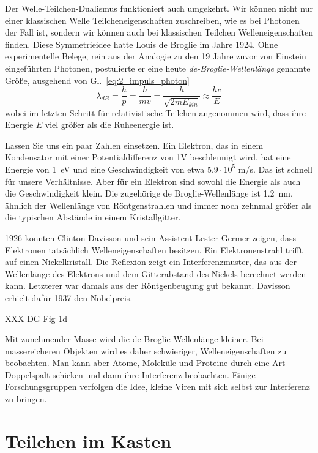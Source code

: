  Der Welle-Teilchen-Dualismus funktioniert auch umgekehrt. Wir können nicht nur einer klassischen Welle Teilcheneigenschaften zuschreiben, wie es bei Photonen der Fall ist, sondern wir können auch bei klassischen Teilchen Welleneigenschaften finden. Diese Symmetrieidee hatte Louis de Broglie im Jahre 1924. Ohne experimentelle Belege, rein aus der Analogie zu den 19 Jahre zuvor von Einstein eingeführten Photonen, postulierte er eine heute \emph{de-Broglie-Wellenlänge} genannte Größe, ausgehend von Gl.~\ref{eq:2_impuls_photon}
 \begin{equation}
     \lambda_{dB} = \frac{h}{p} = \frac{h}{m v} = \frac{h}{\sqrt{2 m E_{kin}}} \approx \frac{h c}{E}
 \end{equation}
 wobei im letzten Schritt für relativistische Teilchen angenommen wird, dass ihre Energie $E$ viel größer als die Ruheenergie ist.
 
 
 Lassen Sie uns ein paar Zahlen einsetzen. Ein Elektron, das in einem Kondensator mit einer Potentialdifferenz von \si{1}{V} beschleunigt wird, hat eine Energie von 1~eV und eine Geschwindigkeit von etwa $5.9 \cdot 10^5$ m/s. Das ist schnell für unsere Verhältnisse. Aber für ein Elektron sind sowohl die Energie als auch die Geschwindigkeit klein. Die zugehörige de Broglie-Wellenlänge ist 1.2~nm, ähnlich der Wellenlänge von Röntgenstrahlen und immer noch zehnmal größer als die typischen Abstände in einem Kristallgitter.

 1926 konnten Clinton Davisson und sein Assistent Lester Germer zeigen, dass Elektronen tatsächlich Welleneigenschaften besitzen.
 Ein Elektronenstrahl trifft auf einen Nickelkristall. Die Reflexion zeigt ein Interferenzmuster, das aus der Wellenlänge des Elektrons und dem Gitterabstand des Nickels berechnet werden kann. Letzterer war damals aus der Röntgenbeugung gut bekannt. Davisson erhielt dafür 1937 den Nobelpreis.
 
 \begin{marginfigure}
    \caption{ XXX DG Fig 1d}
\end{marginfigure}


 Mit zunehmender Masse wird die de Broglie-Wellenlänge kleiner. Bei massereicheren Objekten wird es daher schwieriger, Welleneigenschaften zu beobachten. Man kann aber Atome, Moleküle und Proteine durch eine Art Doppelspalt schicken und dann ihre Interferenz beobachten. Einige Forschungsgruppen verfolgen die Idee, kleine Viren mit sich selbst zur Interferenz zu bringen.


 \section{Teilchen im Kasten}

